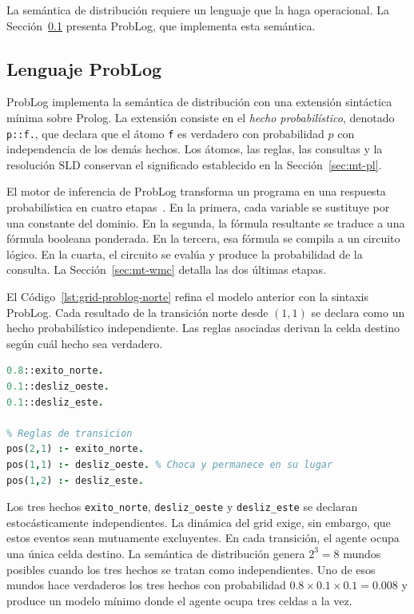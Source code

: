 La semántica de distribución requiere un lenguaje que la haga operacional. La Sección~\ref{sec:mt-problog} presenta ProbLog, que implementa esta semántica.

\subsection{Lenguaje ProbLog}
\label{sec:mt-problog}

ProbLog \cite{deraedt2007problog, deraedt2015probabilistic} implementa la semántica de distribución con una extensión sintáctica mínima sobre Prolog. La extensión consiste en el \textit{hecho probabilístico}, denotado \texttt{p::f.}, que declara que el átomo \texttt{f} es verdadero con probabilidad $p$ con independencia de los demás hechos. Los átomos, las reglas, las consultas y la resolución SLD conservan el significado establecido en la Sección~\ref{sec:mt-pl}.

El motor de inferencia de ProbLog transforma un programa en una respuesta probabilística en cuatro etapas~\cite{fierens2015inference}. En la primera, cada variable se sustituye por una constante del dominio. En la segunda, la fórmula resultante se traduce a una fórmula booleana ponderada. En la tercera, esa fórmula se compila a un circuito lógico. En la cuarta, el circuito se evalúa y produce la probabilidad de la consulta. La Sección~\ref{sec:mt-wmc} detalla las dos últimas etapas.

El Código~\ref{lst:grid-problog-norte} refina el modelo anterior con la sintaxis ProbLog. Cada resultado de la transición norte desde $(1,1)$ se declara como un hecho probabilístico independiente. Las reglas asociadas derivan la celda destino según cuál hecho sea verdadero.

\begin{lstlisting}[caption={Transición para la acción norte desde $(1,1)$ con hechos probabilísticos independientes.}, label={lst:grid-problog-norte}, language=Prolog]
% Hechos probabilisticos independientes
0.8::exito_norte.
0.1::desliz_oeste.
0.1::desliz_este.

% Reglas de transicion
pos(2,1) :- exito_norte.
pos(1,1) :- desliz_oeste. % Choca y permanece en su lugar
pos(1,2) :- desliz_este.
\end{lstlisting}

Los tres hechos \texttt{exito\_norte}, \texttt{desliz\_oeste} y \texttt{desliz\_este} se declaran estocásticamente independientes. La dinámica del grid exige, sin embargo, que estos eventos sean mutuamente excluyentes. En cada transición, el agente ocupa una única celda destino. La semántica de distribución genera $2^3 = 8$ mundos posibles cuando los tres hechos se tratan como independientes. Uno de esos mundos hace verdaderos los tres hechos con probabilidad $0.8 \times 0.1 \times 0.1 = 0.008$ y produce un modelo mínimo donde el agente ocupa tres celdas a la vez.

